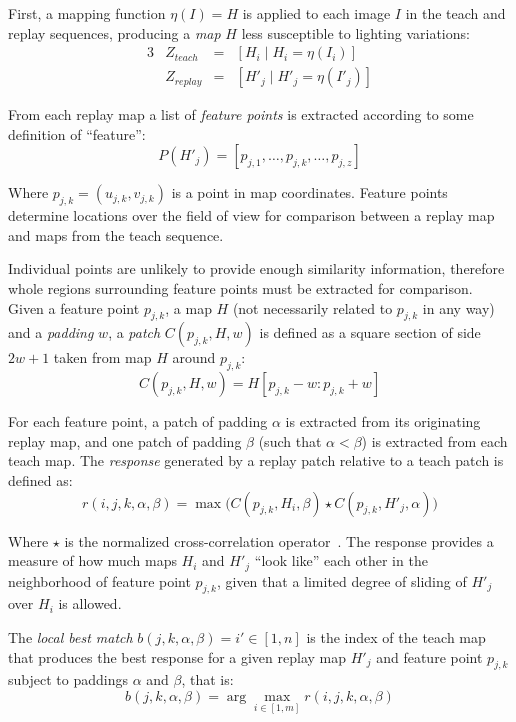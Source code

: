 \documentclass[twocolumn, 9pt,fleqn]{jsproceedings}
\begin{document}
First, a mapping function $\eta(I) = H$ is applied to each image $I$ in the teach and replay sequences, producing a \textit{map} $H$ less susceptible to lighting variations:
\begin{alignat}{3}
& Z_{teach} & = & [H_i \; | \; H_i = \eta(I_i)] \\
& Z_{replay} & = & [H'_j \; | \; H'_j = \eta(I'_j)]
\end{alignat}

From each replay map a list of \textit{feature points} is extracted according to some definition of ``feature'':
\begin{equation}
P(H'_j) = [p_{j,1}, \dotsc, p_{j,k}, \dotsc, p_{j,z}]
\end{equation}

Where $p_{j,k} = (u_{j,k}, v_{j,k})$ is a point in map coordinates. Feature points determine locations over the field of view for comparison between a replay map and maps from the teach sequence.

Individual points are unlikely to provide enough similarity information, therefore whole regions surrounding feature points must be extracted for comparison. Given a feature point $p_{j,k}$, a map $H$ (not necessarily related to $p_{j,k}$ in any way) and a \textit{padding} $w$, a \textit{patch} $C(p_{j,k}, H, w)$ is defined as a square section of side $2w+1$ taken from map $H$ around $p_{j,k}$:
\begin{equation}
C(p_{j,k}, H, w) = H[p_{j,k} - w : p_{j,k} + w]
\end{equation}

For each feature point, a patch of padding $\alpha$ is extracted from its originating replay map, and one patch of padding $\beta$ (such that $\alpha < \beta$) is extracted from each teach map. The \textit{response} generated by a replay patch relative to a teach patch is defined as:
\begin{equation}
r(i, j, k, \alpha, \beta) = \max \big( C(p_{j,k}, H_i, \beta) \star C(p_{j,k}, H'_j, \alpha) \big)
\end{equation}

Where $\star$ is the normalized cross-correlation operator~\cite{HEL14b}. The response provides a measure of how much maps $H_i$ and $H'_j$ ``look like'' each other in the neighborhood of feature point $p_{j,k}$, given that a limited degree of sliding of $H'_j$ over $H_i$ is allowed.

The \textit{local best match} $b(j, k, \alpha, \beta) = i' \in [1, n]$ is the index of the teach map that produces the best response for a given replay map $H'_j$ and feature point $p_{j,k}$ subject to paddings $\alpha$ and $\beta$, that is:
\begin{equation}
b(j, k, \alpha, \beta) = \arg \max_{i \in [1, m]} {r(i, j, k, \alpha, \beta)}
\end{equation}
\end{document}
